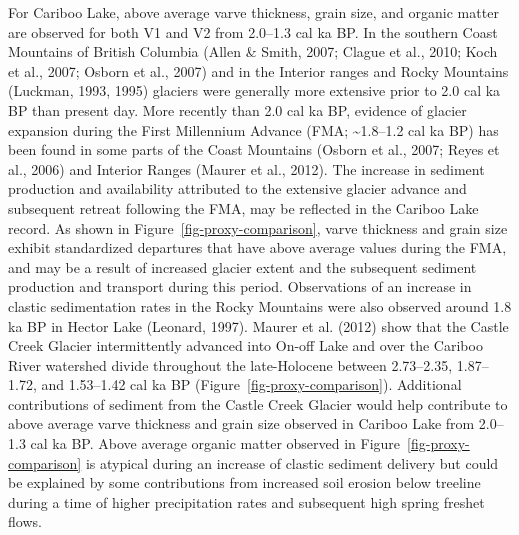 \documentclass[
  letterpaper,
  DIV=11,
  numbers=noendperiod]{scrartcl}
\begin{document}
For Cariboo Lake, above average varve thickness, grain size, and organic
matter are observed for both V1 and V2 from 2.0--1.3 cal ka BP. In the
southern Coast Mountains of British Columbia (Allen \& Smith, 2007;
Clague et al., 2010; Koch et al., 2007; Osborn et al., 2007) and in the
Interior ranges and Rocky Mountains (Luckman, 1993, 1995) glaciers were
generally more extensive prior to 2.0 cal ka BP than present day. More
recently than 2.0 cal ka BP, evidence of glacier expansion during the
First Millennium Advance (FMA; \textasciitilde1.8--1.2 cal ka BP) has
been found in some parts of the Coast Mountains (Osborn et al., 2007;
Reyes et al., 2006) and Interior Ranges (Maurer et al., 2012). The
increase in sediment production and availability attributed to the
extensive glacier advance and subsequent retreat following the FMA, may
be reflected in the Cariboo Lake record. As shown in
Figure~\ref{fig-proxy-comparison}, varve thickness and grain size
exhibit standardized departures that have above average values during
the FMA, and may be a result of increased glacier extent and the
subsequent sediment production and transport during this period.
Observations of an increase in clastic sedimentation rates in the Rocky
Mountains were also observed around 1.8 ka BP in Hector Lake (Leonard,
1997). Maurer et al. (2012) show that the Castle Creek Glacier
intermittently advanced into On-off Lake and over the Cariboo River
watershed divide throughout the late-Holocene between 2.73--2.35,
1.87--1.72, and 1.53--1.42 cal ka BP
(Figure~\ref{fig-proxy-comparison}). Additional contributions of
sediment from the Castle Creek Glacier would help contribute to above
average varve thickness and grain size observed in Cariboo Lake from
2.0--1.3 cal ka BP. Above average organic matter observed in
Figure~\ref{fig-proxy-comparison} is atypical during an increase of
clastic sediment delivery but could be explained by some contributions
from increased soil erosion below treeline during a time of higher
precipitation rates and subsequent high spring freshet flows.
\end{document}
